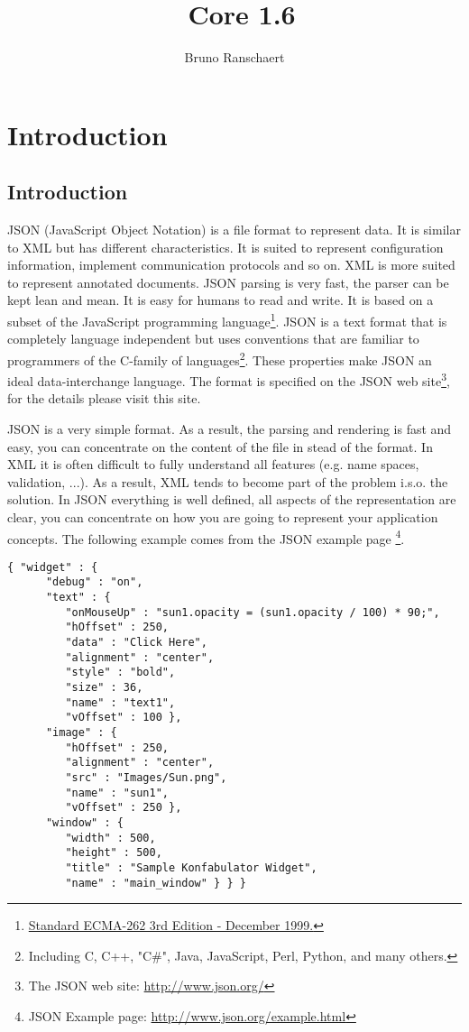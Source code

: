 \documentclass[a4paper]{article}
\title{\jtools\ Core 1.6}
\author{Bruno Ranschaert}
\newcommand{\java}{Java}
\begin{document}
\maketitle
\tableofcontents

\section{Introduction}
\subsection{Introduction}

JSON (JavaScript Object Notation) is a file format to represent data. It is similar to XML but has different characteristics. It is suited to represent configuration information, implement communication protocols and so on.  XML is more suited to represent annotated documents. 
JSON parsing is very fast, the parser can be kept lean and mean. It is easy for humans to read and write.  
It is based on a subset of the JavaScript programming language\footnote{\href{http://www.ecma-international.org/publications/standards/Ecma-262.htm}{Standard ECMA-262 3rd Edition - December 1999.}}.  JSON is a text format that is completely language independent but uses conventions that are familiar to programmers of the C-family of languages\footnote{Including C, C++, "C\#", \java, JavaScript, Perl, Python, and many others.}.  These properties make JSON an ideal data-interchange language. 
The format is specified on the JSON web site\footnote{The JSON web site: \url{http://www.json.org/}}, for the details please visit this site.

JSON is a very simple format. As a result, the parsing and rendering is fast and easy, you can concentrate on  the content of the file in stead of the format.  
In XML it is often difficult to fully understand all features (e.g. name spaces, validation, ...).  
As a result, XML tends to become part of the problem i.s.o. the solution. 
In JSON everything is well defined, all aspects of the representation are clear, you can concentrate on how you are going to represent your application concepts. The following example comes from the JSON example page  \footnote{JSON Example page: \url{http://www.json.org/example.html}}.

\medskip
\begin{lstlisting}
{ "widget" : {
      "debug" : "on",
      "text" : {
         "onMouseUp" : "sun1.opacity = (sun1.opacity / 100) * 90;",
         "hOffset" : 250,
         "data" : "Click Here",
         "alignment" : "center",
         "style" : "bold",
         "size" : 36,
         "name" : "text1",
         "vOffset" : 100 },
      "image" : {
         "hOffset" : 250,
         "alignment" : "center",
         "src" : "Images/Sun.png",
         "name" : "sun1",
         "vOffset" : 250 },
      "window" : {
         "width" : 500,
         "height" : 500,
         "title" : "Sample Konfabulator Widget",
         "name" : "main_window" } } }
\end{lstlisting}
\medskip
\end{document}
